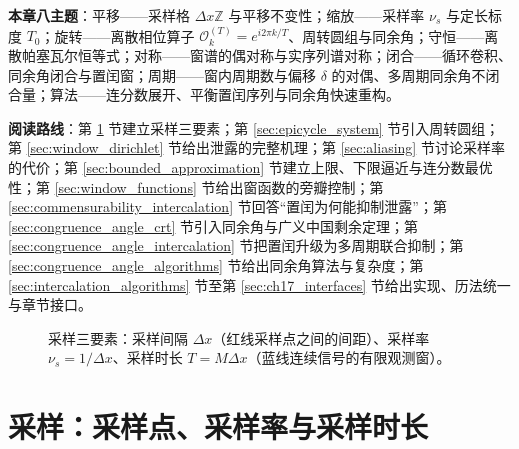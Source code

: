 \begin{remark}[本章定位与主线]
\textbf{本章八主题}：平移——采样格 $\Delta x\mathbb{Z}$ 与平移不变性；缩放——采样率 $\nu_s$ 与定长标度 $T_0$；旋转——离散相位算子 $\mathcal{O}_k^{(T)}=e^{i2\pi k/T}$、周转圆组与同余角；守恒——离散帕塞瓦尔恒等式；对称——窗谱的偶对称与实序列谱对称；闭合——循环卷积、同余角闭合与置闰窗；周期——窗内周期数与偏移 $\delta$ 的对偶、多周期同余角不闭合量；算法——连分数展开、平衡置闰序列与同余角快速重构。

\textbf{阅读路线}：第 \ref{sec:sampling_basics} 节建立采样三要素；第 \ref{sec:epicycle_system} 节引入周转圆组；第 \ref{sec:window_dirichlet} 节给出泄露的完整机理；第 \ref{sec:aliasing} 节讨论采样率的代价；第 \ref{sec:bounded_approximation} 节建立上限、下限逼近与连分数最优性；第 \ref{sec:window_functions} 节给出窗函数的旁瓣控制；第 \ref{sec:commensurability_intercalation} 节回答“置闰为何能抑制泄露”；第 \ref{sec:congruence_angle_crt} 节引入同余角与广义中国剩余定理；第 \ref{sec:congruence_angle_intercalation} 节把置闰升级为多周期联合抑制；第 \ref{sec:congruence_angle_algorithms} 节给出同余角算法与复杂度；第 \ref{sec:intercalation_algorithms} 节至第 \ref{sec:ch17_interfaces} 节给出实现、历法统一与章节接口。
\end{remark}

\begin{figure}[htbp]
\centering
{}
\caption{采样三要素：采样间隔 $\Delta x$（红线采样点之间的间距）、采样率 $\nu_s=1/\Delta x$、采样时长 $T=M\Delta x$（蓝线连续信号的有限观测窗）。}
\label{fig:sampling_three_elements}
\end{figure}

\section{采样：采样点、采样率与采样时长}\label{sec:sampling_basics}

